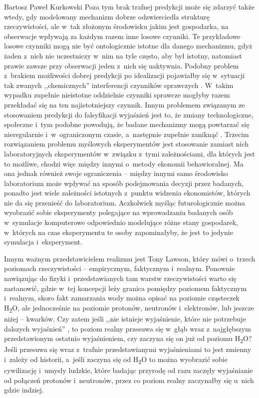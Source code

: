 \begin{artplenv}{Bartosz Paweł Kurkowski}
Poza tym brak trafnej predykcji może się zdarzyć także wtedy, gdy
modelowany mechanizm dobrze odzwierciedla strukturę rzeczywistości, ale w~tak złożonym środowisku jakim jest
gospodarka, na obserwacje wpływają za każdym razem inne losowe czynniki. Te przykładowe losowe czynniki mogą nie być
ontologicznie istotne dla danego mechanizmu, gdyż żaden z~nich nie uczestniczy w~nim na tyle często, aby był istotny,
natomiast prawie zawsze przy obserwacji jeden z~nich się uaktywnia. Podobny problem z~brakiem możliwości dobrej
predykcji po idealizacji pojawiałby się w~sytuacji tak zwanych ,,chemicznych'' interferencji czynników sprawczych
\parencite[s.~89]{hardt_studia_2013}.
W~takim wypadku zupełnie nieistotne oddzielnie czynniki sprawcze mogłyby
razem przekładać się na ten najistotniejszy czynnik. Innym problemem związanym ze stosowaniem predykcji do falsyfikacji
wyjaśnień jest to, że zmiany technologiczne, społeczne i~tym podobne powodują, że badane mechanizmy mogą powtarzać się
nieregularnie i~w~ograniczonym czasie, a~następnie zupełnie zaniknąć
\parencites[s.~116]{hardt_studia_2013}[s.~271]{gorazda_filozofia_2014}.
Trzecim rozwiązaniem problemu myślowych eksperymentów jest stosowanie zamiast nich
laboratoryjnych eksperymentów w~związku z~tymi zależnościami, dla których jest to możliwe, chodzi więc między
innymi o~metody ekonomii behawioralnej. Ma ona jednak również swoje ograniczenia -- między innymi samo środowisko laboratorium
może wpływać na sposób podejmowania decyzji przez badanych, ponadto jest wiele zależności istotnych z~punktu widzenia
ekonomistów, których nie da się przenieść do laboratorium. Aczkolwiek myśląc futurologicznie można wyobrazić sobie
eksperymenty polegające na wprowadzaniu badanych osób w~symulacje komputerowe odpowiednio modelujące różne stany
gospodarek, w~których na czas eksperymentu te osoby zapominałyby, że jest to jedynie symulacja i~eksperyment.


Innym ważnym przedstawicielem realizmu jest Tony Lawson, który mówi o~trzech poziomach rzeczywistości -- empirycznym,
faktycznym i~realnym. Ponownie nawiązując do fizyki i~przedstawianych tam warstw rzeczywistości warto się zastanowić,
gdzie w~tej koncepcji leży granica pomiędzy poziomem faktycznym i~realnym, skoro fakt zamarzania wody można opisać na
poziomie cząsteczek H\textsubscript{2}O, ale jednocześnie na poziomie protonów, neutronów i~elektronów, lub jeszcze
niżej -- kwarków. Czy zatem jeśli ,,nie istnieje wyjaśnienie, które nie potrzebuje dalszych wyjaśnień''
\parencite[s.~235]{popper_cel_2002},
to poziom realny przesuwa się w~głąb wraz z~najgłębszym przedstawionym
ostatnio wyjaśnieniem, czy zaczyna się on już od poziomu H\textsubscript{2}O? Jeśli przesuwa się wraz z~trafnie
przedstawianymi wyjaśnieniami to jest zmienny i~zależy od historii, a~jeśli zaczyna się od H\textsubscript{2}O to można
wyobrazić sobie cywilizację i~umysły ludzkie, które badając przyrodę od razu zaczęły wyjaśnianie od połączeń
protonów i~neutronów, przez co poziom realny zaczynałby się u~nich gdzie indziej.



\end{artplenv}
